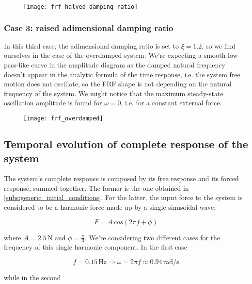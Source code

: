 \documentclass[a4paper,12pt,oneside]{article}
\begin{document}
\vspace{16pt}

\begin{figure}[h]
	\centering
	\texttt{[image: frf\_halved\_damping\_ratio]}
\end{figure}

\clearpage

\subsubsection*{Case 3: raised adimensional damping ratio}

In this third case, the adimensional damping ratio is set to $ \xi = 1.2 $, so we find ourselves in the case of the overdamped system. We're expecting a smooth low-pass-like curve in the amplitude diagram as the damped natural frequency doesn't appear in the analytic formula of the time response, i.e. the system free motion does not oscillate, so the FRF shape is not depending on the natural frequency of the system. We might notice that the maximum steady-state oscillation amplitude is found for $ \omega = 0 $, i.e. for a constant external force.

\vspace{16pt}

\begin{figure}[h]
	\centering
	\texttt{[image: frf\_overdamped]}
\end{figure}

\subsection{Temporal evolution of complete response of the system}

The system's complete response is composed by its free response and its forced response, summed together. The former is the one obtained in \ref{subs:generic_initial_conditions}. For the latter, the input force to the system is considered to be a harmonic force made up by a single sinusoidal wave:

\[ F = A \, cos(2 \pi f + \phi) \]

where $ A = 2.5 \, \text{N} $ and $ \phi = \frac{\pi}{3} $. We're considering two different cases for the frequency of this single harmonic component. In the first case

\[
	f = 0.15 \, \text{Hz} \Rightarrow %
	\omega = 2 \pi f \approx 0.94 \, \text{rad/s}
\]

while in the second
\end{document}
